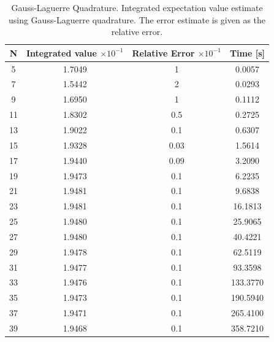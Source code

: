 \documentclass[%
reprint,nofootinbib,
amsmath,amssymb,
aps,
]{revtex4-1}
\begin{document}
\begin{table}[!h]
	\caption{Gauss-Laguerre Quadrature. \label{laguerre_values} \centering Integrated expectation value estimate using Gauss-Laguerre quadrature. The error estimate is given as the relative error.}
	\begin{tabular}{|c|c|c|c|}
		\hline 
		\hspace{5mm} \textbf{N} \hspace{5mm} & \textbf{Integrated value} $\times 10^{-1}$ & \textbf{Relative Error} $\times 10^{-1}$ & \hspace{3mm}\textbf{Time  [s]} \hspace{5mm}\\
		\hline 
			5 & 1.7049  & 1  & 0.0057 \\
			7 & 1.5442  & 2  & 0.0293 \\
			9 & 1.6950  & 1  & 0.1112 \\
			11 & 1.8302  & 0.5  & 0.2725 \\
			13 & 1.9022  & 0.1  & 0.6307 \\
			15 & 1.9328  & 0.03  & 1.5614 \\
			17 & 1.9440  & 0.09  & 3.2090 \\
			19 & 1.9473  & 0.1  & 6.2235 \\
			21 & 1.9481  & 0.1  & 9.6838 \\
			23 & 1.9481  & 0.1  & 16.1813 \\
			25 & 1.9480  & 0.1  & 25.9065 \\
			27 & 1.9480  & 0.1  & 40.4221 \\
			29 & 1.9478  & 0.1  & 62.5119 \\
			31 & 1.9477  & 0.1  & 93.3598 \\
			33 & 1.9476  & 0.1  & 133.3770 \\
			35 & 1.9473  & 0.1  & 190.5940 \\
			37 & 1.9471  & 0.1  & 265.4100 \\
			39 & 1.9468  & 0.1  & 358.7210 \\

		
		\hline 
	\end{tabular}
\end{table}

\newpage 
\end{document}
